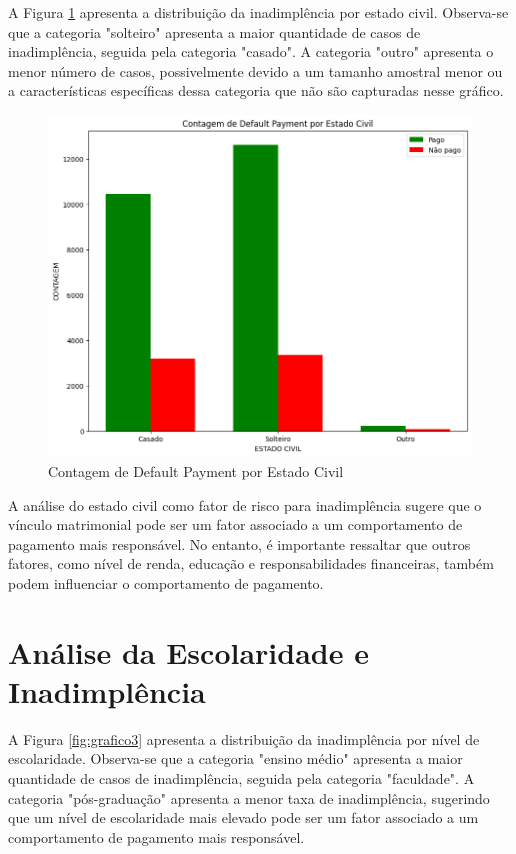 \documentclass{abntpuc}
\begin{document}
A Figura \ref{fig:grafico2} apresenta a distribuição da inadimplência por estado civil. Observa-se que a categoria "solteiro" apresenta a maior quantidade de casos de inadimplência, seguida pela categoria "casado". A categoria "outro" apresenta o menor número de casos, possivelmente devido a um tamanho amostral menor ou a características específicas dessa categoria que não são capturadas nesse gráfico.

\begin{figure}[H]
    \centering
    \includegraphics[width=\textwidth]{grafico2.png}
    \caption{Contagem de Default Payment por Estado Civil}
    \label{fig:grafico2}
\end{figure}

A análise do estado civil como fator de risco para inadimplência sugere que o vínculo matrimonial pode ser um fator associado a um comportamento de pagamento mais responsável. No entanto, é importante ressaltar que outros fatores, como nível de renda, educação e responsabilidades financeiras, também podem influenciar o comportamento de pagamento.

\section{Análise da Escolaridade e Inadimplência}

A Figura \ref{fig:grafico3} apresenta a distribuição da inadimplência por nível de escolaridade. Observa-se que a categoria "ensino médio" apresenta a maior quantidade de casos de inadimplência, seguida pela categoria "faculdade". A categoria "pós-graduação" apresenta a menor taxa de inadimplência, sugerindo que um nível de escolaridade mais elevado pode ser um fator associado a um comportamento de pagamento mais responsável.
\end{document}
